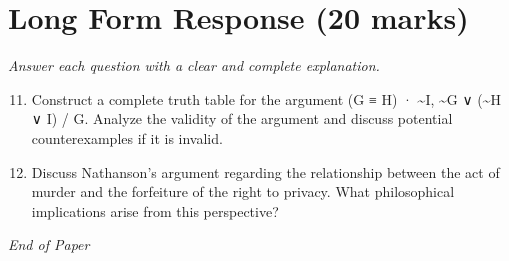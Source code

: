 \documentclass[12pt]{article}
\begin{document}
\section*{Long Form Response (20 marks)}
\textit{Answer each question with a clear and complete explanation.}
\begin{enumerate}[label=\arabic*.]
\setcounter{enumi}{10}
\item Construct a complete truth table for the argument (G ≡ H) · \textasciitilde{}I, \textasciitilde{}G ∨ (\textasciitilde{}H ∨ I) / G. Analyze the validity of the argument and discuss potential counterexamples if it is invalid.
\item Discuss Nathanson's argument regarding the relationship between the act of murder and the forfeiture of the right to privacy. What philosophical implications arise from this perspective?
\end{enumerate}

\vfill
\noindent\textit{End of Paper}
\end{document}
